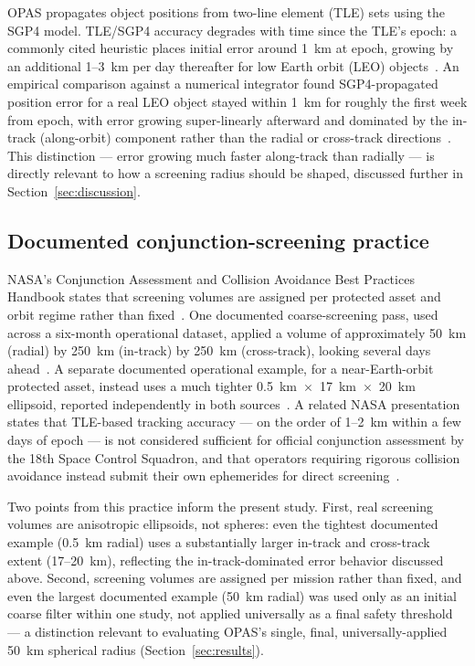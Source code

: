 \documentclass[11pt,a4paper]{article}
\begin{document}
OPAS propagates object positions from two-line element (TLE) sets using the
SGP4 model. TLE/SGP4 accuracy degrades with time since the TLE's epoch: a
commonly cited heuristic places initial error around 1~km at epoch, growing by
an additional 1--3~km per day thereafter for low Earth orbit (LEO)
objects~\cite{jaxsgp4}. An empirical comparison against a numerical
integrator found SGP4-propagated position error for a real LEO object stayed
within 1~km for roughly the first week from epoch, with error growing
super-linearly afterward and dominated by the in-track (along-orbit)
component rather than the radial or cross-track directions~\cite{afit_sgp4}.
This distinction --- error growing much faster along-track than radially ---
is directly relevant to how a screening radius should be shaped, discussed
further in Section~\ref{sec:discussion}.

\subsection{Documented conjunction-screening practice}

NASA's Conjunction Assessment and Collision Avoidance Best Practices Handbook
states that screening volumes are assigned per protected asset and orbit
regime rather than fixed~\cite{nasa_handbook}. One documented coarse-screening
pass, used across a six-month operational dataset, applied a volume of
approximately 50~km (radial) by 250~km (in-track) by 250~km (cross-track),
looking several days ahead~\cite{nasa_screening}. A separate documented
operational example, for a near-Earth-orbit protected asset, instead uses a
much tighter 0.5~km~$\times$~17~km~$\times$~20~km ellipsoid, reported
independently in both sources~\cite{nasa_screening,nasa_handbook}. A related
NASA presentation states that TLE-based tracking accuracy --- on the order
of 1--2~km within a few days of epoch --- is not considered sufficient for
official conjunction assessment by the 18th Space Control Squadron, and that
operators requiring rigorous collision avoidance instead submit their own
ephemerides for direct screening~\cite{nasa_cospar}.

Two points from this practice inform the present study. First, real
screening volumes are anisotropic ellipsoids, not spheres: even the
tightest documented example (0.5~km radial) uses a substantially larger
in-track and cross-track extent (17--20~km), reflecting the
in-track-dominated error behavior discussed above. Second, screening
volumes are assigned per mission rather than fixed, and even the largest
documented example (50~km radial) was used only as an initial coarse
filter within one study, not applied universally as a final safety
threshold --- a distinction relevant to evaluating OPAS's single, final,
universally-applied 50~km spherical radius (Section~\ref{sec:results}).
\end{document}
